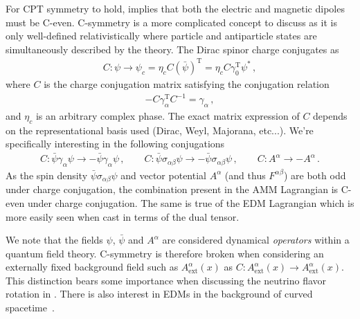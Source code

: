 For CPT symmetry to hold,  implies that both the electric and magnetic dipoles must be C-even. C-symmetry is a more complicated concept to discuss as it is only well-defined relativistically where particle and antiparticle states are simultaneously described by the theory. The Dirac spinor charge conjugates as
\begin{align}
    \label{c:1}
    C:\psi\rightarrow\psi_{c}=\eta_{c}C(\bar\psi)^\mathrm{T}= \eta_{c}C\gamma_{0}^\mathrm{T}\psi^{*}\,,
\end{align}
where $C$ is the charge conjugation matrix satisfying the conjugation relation
\begin{align}
    \label{c:2}
    -C\gamma_{\alpha}^\mathrm{T}C^{-1}=\gamma_{\alpha}\,,
\end{align}
and $\eta_{c}$ is an arbitrary complex phase. The exact matrix expression of $C$ depends on the representational basis used (Dirac, Weyl, Majorana, etc...). We're specifically interesting in the following conjugations
\begin{align}
    \label{c:3}
    C:\bar\psi\gamma_{\alpha}\psi\rightarrow-\bar\psi\gamma_{\alpha}\psi\,,\qquad
    C:\bar\psi\sigma_{\alpha\beta}\psi\rightarrow-\bar\psi\sigma_{\alpha\beta}\psi\,,\qquad
    C:A^{\alpha}\rightarrow-A^{\alpha}\,.
\end{align}
As the spin density $\bar\psi\sigma_{\alpha\beta}\psi$ and vector potential $A^{\alpha}$ (and thus $F^{\alpha\beta}$) are both odd under charge conjugation, the combination present in the AMM Lagrangian  is C-even under charge conjugation. The same is true of the EDM Lagrangian  which is more easily seen when cast in terms of the dual tensor.

We note that the fields $\psi$, $\bar\psi$ and $A^{\alpha}$ are considered dynamical \emph{operators} within a quantum field theory. C-symmetry is therefore broken when considering an externally fixed background field such as $A_\mathrm{ext}^{\alpha}(x)$ as $C:A_\mathrm{ext}^{\alpha}(x)\rightarrow A_\mathrm{ext}^{\alpha}(x)$. This distinction bears some importance when discussing the neutrino flavor rotation in . There is also interest in EDMs in the background of curved spacetime~\citep{Filho:2023lqe}.

